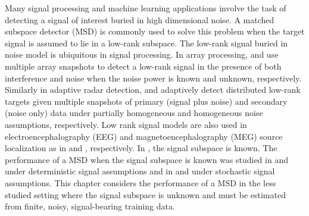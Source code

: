 
Many signal processing  \cite{scharf1991statistical} and machine learning \cite{friedman2001elements} applications involve the task of detecting a signal of interest buried in high dimensional noise. A matched subspace detector (MSD) is commonly used to solve this problem when the target signal is assumed to lie in a low-rank subspace.  The low-rank signal buried in noise model is ubiquitous in signal processing. In array processing, \cite{besson2005matched} and \cite{besson2006cfar} use multiple array snapshots to detect a low-rank signal in the presence of both interference and noise when the noise power is known and unknown, respectively. Similarly in adaptive radar detection, \cite{bandiera2007adaptive} and \cite{bandiera2007glrt} adaptively detect distributed low-rank targets given multiple snapshots of primary (signal plus noise) and secondary (noise only) data under partially homogeneous and homogeneous noise assumptions, respectively. Low rank signal models are also used in electroencephalography (EEG) and magnetoencephalography (MEG) source localization as in \cite{maris2003resampling} and \cite{soong1995principal}, respectively. In \cite{besson2005matched,besson2006cfar,bandiera2007adaptive,bandiera2007glrt}, the signal subspace is known. The performance of a MSD when the signal subspace is known was studied in \cite{scharf1994matched} and \cite{vincent2008matched} under deterministic signal assumptions and in \cite{mcwhorter2003matched} and \cite{jin2005cfar} under stochastic signal assumptions. This chapter considers the performance of a MSD in the less studied setting where the signal subspace is unknown and must be estimated from finite, noisy, signal-bearing training data.

